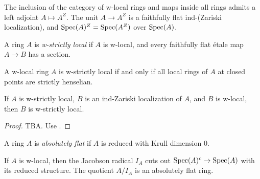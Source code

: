 \begin{lemma}
\begin{definition}
    \label{def:w-localization-ring}
    The inclusion of the category of w-local rings and maps inside all rings admits a left adjoint $A \mapsto A^Z$. The unit $A \to A^Z$ is a faithfully flat ind-(Zariski localization), and $\operatorname{Spec}(A)^Z = \operatorname{Spec}(A^Z)$ over $\operatorname{Spec}(A)$.
\end{definition}

\begin{definition}
    A ring \(A\) is \emph{w-strictly local} if \(A\) is w-local, and every faithfully flat \'etale map \(A \to B\) has a section.
    \label{def:w-strictly-local-ring}
\end{definition}

\begin{lemma}
    \label{lem:w-strictly-local-closed-points}

    A w-local ring $A$ is w-strictly local if and only if all local rings of $A$ at closed points are strictly henselian.
\end{lemma}

\begin{lemma}
    \label{lem:w-strictly-local-ind-Zariski-localization}
    If $A$ is w-strictly local, $B$ is an ind-Zariski localization of $A$, and $B$ is w-local, then $B$ is w-strictly local.
\end{lemma}

\begin{proof}

    TBA. Use .
\end{proof}

\begin{definition}
    A ring \(A\) is \emph{absolutely flat} if \(A\) is reduced with Krull dimension \(0\).
    \label{def:absolute-flat-ring}
\end{definition}

\begin{lemma}
    \label{lem:w-local-quotient-Jacobson-absolute-flat}

    If \(A\) is w-local, then the Jacobson radical \(I_A\) cuts out \(\operatorname{Spec}(A)^c \to \operatorname{Spec}(A)\) with its reduced structure. The quotient \(A/I_A\) is an absolutely flat ring.
\end{lemma}


\end{lemma}
